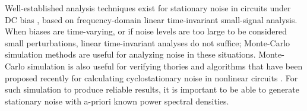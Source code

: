 %

Well-established analysis techniques exist for stationary noise in circuits
under DC bias \cite{references}, based on frequency-domain linear
time-invariant small-signal analysis. When biases are time-varying, or if
noise levels are too large to be considered small perturbations, linear
time-invariant analyses do not suffice; Monte-Carlo simulation methods
\cite{rubinstein} are useful for analyzing noise in these situations.
Monte-Carlo simulation is also useful for verifying thories and algorithms
that have been proposed recently for calculating cyclostationary noise in
nonlinear circuits \cite{newwork}. For such simulation to produce reliable
results, it is important to be able to generate stationary noise with a-priori 
known power spectral densities.


